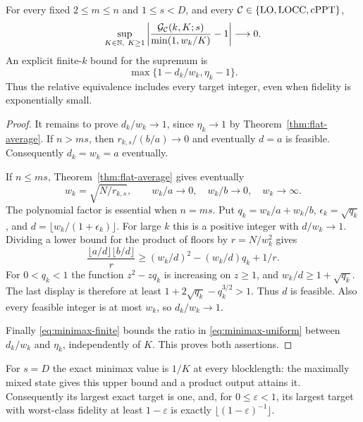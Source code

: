 \begin{theorem}\label{thm:minimax}
For every fixed $2\le m\le n$ and $1\le s<D$, and every $\mathcal C\in\{\mathrm{LO},\mathrm{LOCC},\mathrm{cPPT}\}$,
\begin{equation}\label{eq:minimax-uniform}
 \sup_{K\in\mathbb N,\ K\ge1}
 \left|\frac{\mathcal G_{\mathcal C}(k,K;s)}{\min(1,w_k/K)}-1\right|\longrightarrow0.
\end{equation}
An explicit finite-$k$ bound for the supremum is
\begin{equation}\label{eq:minimax-relative-bound}
 \max\{1-d_k/w_k,\eta_k-1\}.
\end{equation}
Thus the relative equivalence includes every target integer, even when fidelity is exponentially small.
\end{theorem}
\begin{proof}
It remains to prove $d_k/w_k\to1$, since $\eta_k\to1$ by Theorem~\ref{thm:flat-average}. If $n>ms$, then
$r_{k,s}/(b/a)\to0$ and eventually $d=a$ is feasible. Consequently $d_k=w_k=a$ eventually.

If $n\le ms$, Theorem~\ref{thm:flat-average} gives eventually
\[
 w_k=\sqrt{N/r_{k,s}},\qquad
 w_k/a\to0,\quad w_k/b\to0,\quad w_k\to\infty.
\]
The polynomial factor is essential when $n=ms$. Put $q_k=w_k/a+w_k/b$, $\epsilon_k=\sqrt{q_k}$, and $d=\lfloor w_k/(1+\epsilon_k)\rfloor$. For large $k$ this is a positive integer with $d/w_k\to1$. Dividing a lower bound for the product of floors by $r=N/w_k^2$ gives
\[
 \frac{\lfloor a/d\rfloor\lfloor b/d\rfloor}{r}
 \ge (w_k/d)^2-(w_k/d)q_k+1/r.
\]
For $0<q_k<1$ the function $z^2-zq_k$ is increasing on $z\ge1$, and $w_k/d\ge1+\sqrt{q_k}$. The last display is therefore at least
$1+2\sqrt{q_k}-q_k^{3/2}>1$. Thus $d$ is feasible. Also every feasible integer is at most $w_k$, so $d_k/w_k\to1$.

Finally \eqref{eq:minimax-finite} bounds the ratio in \eqref{eq:minimax-uniform} between $d_k/w_k$ and $\eta_k$, independently of $K$. This proves both assertions.
\end{proof}

For $s=D$ the exact minimax value is $1/K$ at every blocklength: the maximally mixed state gives this upper bound and a product output attains it. Consequently its largest exact target is one, and, for $0\le\varepsilon<1$, its largest target with worst-class fidelity at least $1-\varepsilon$ is exactly $\lfloor(1-\varepsilon)^{-1}\rfloor$.

